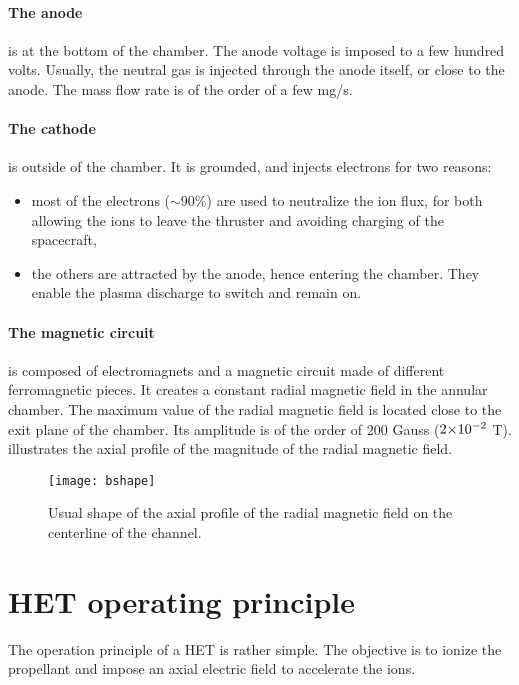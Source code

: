   \paragraph{The anode} is at the bottom of the chamber.
  The anode voltage is imposed to a few hundred volts.
  Usually, the neutral gas is injected through the anode itself, or close to the anode.
  The mass flow rate is of the order of a few mg/s.

  \paragraph{The cathode} is outside of the chamber.
  It is grounded, and injects electrons for two reasons\string:
  \begin{itemize}
    \item most of the electrons ($\sim 90 \%$) are used to neutralize the ion flux, for both allowing the ions to leave the thruster and avoiding charging of the spacecraft,
    \item  the others are attracted by the anode, hence entering the chamber. They enable the plasma discharge to switch and remain on.
  \end{itemize}

  \paragraph{The magnetic circuit} is composed of electromagnets and a magnetic circuit made of different ferromagnetic pieces.
  It creates a constant radial magnetic field in the annular chamber.
  The maximum value of the radial magnetic field is located close to the exit plane of the chamber.
  Its amplitude is of the order of $200$ Gauss (${{2}{\times}10^{-2}}$ T).
   illustrates the axial profile of the magnitude of the radial magnetic field.
  \begin{figure}[hbt]
    \centering
    \texttt{[image: bshape]}
    \caption{Usual shape of the axial profile of the radial magnetic field on the centerline of the channel.}
    \label{fig-bshape}
  \end{figure}


\section{HET operating principle}


  The operation principle of a \ac{HET} is rather simple.
  The objective is to ionize the propellant and impose an axial electric field to accelerate the ions.

